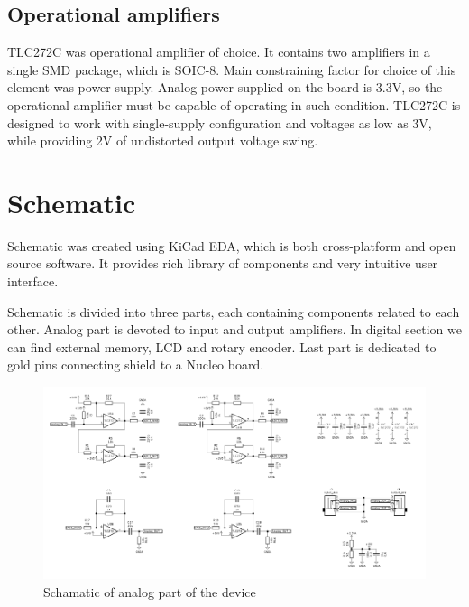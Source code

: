\documentclass[a4paper,twoside,12pt]{book}
\begin{document}
\subsection {Operational amplifiers}

TLC272C was operational amplifier of choice.
It contains two amplifiers in a single SMD package, which is SOIC-8.
Main constraining factor for choice of this element was power supply.
Analog power supplied on the board is 3.3V, so the operational amplifier
must be capable of operating in such condition.
TLC272C is designed to work with single-supply configuration
and voltages as low as 3V,
while providing 2V of undistorted output voltage swing.

\section{Schematic}

Schematic was created using KiCad EDA,
which is both cross-platform and open source software.
It provides rich library of components and very intuitive user interface.

Schematic is divided into three parts,
each containing components related to each other.
Analog part is devoted to input and output amplifiers.
In digital section we can find external memory, LCD and rotary encoder.
Last part is dedicated to gold pins connecting shield to a Nucleo board.

\begin{figure}[H]
    \centering
    \includegraphics[width=\textwidth]{images/Schematic_analog}
    \caption{Schamatic of analog part of the device}
    \label{fig:Schematic1}
\end{figure}
\end{document}
